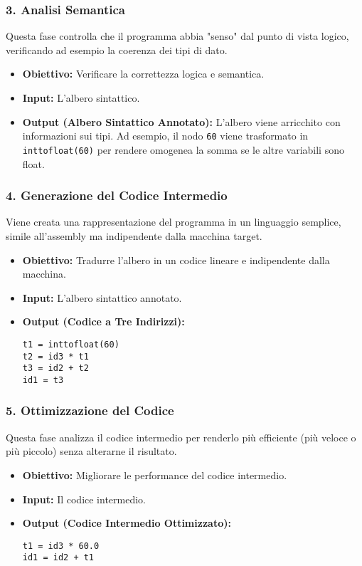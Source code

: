 \subsubsection{3. Analisi Semantica}
Questa fase controlla che il programma abbia "senso" dal punto di vista logico, verificando ad esempio la coerenza dei tipi di dato.
\begin{itemize}
    \item \textbf{Obiettivo:} Verificare la correttezza logica e semantica.
    \item \textbf{Input:} L'albero sintattico.
    \item \textbf{Output (Albero Sintattico Annotato):} L'albero viene arricchito con informazioni sui tipi. Ad esempio, il nodo \texttt{60} viene trasformato in \texttt{inttofloat(60)} per rendere omogenea la somma se le altre variabili sono float.
\end{itemize}

\subsubsection{4. Generazione del Codice Intermedio}
Viene creata una rappresentazione del programma in un linguaggio semplice, simile all'assembly ma indipendente dalla macchina target.
\begin{itemize}
    \item \textbf{Obiettivo:} Tradurre l'albero in un codice lineare e indipendente dalla macchina.
    \item \textbf{Input:} L'albero sintattico annotato.
    \item \textbf{Output (Codice a Tre Indirizzi):}
    \begin{Verbatim}[frame=single, label=Codice Intermedio]
t1 = inttofloat(60)
t2 = id3 * t1
t3 = id2 + t2
id1 = t3
    \end{Verbatim}
\end{itemize}

\subsubsection{5. Ottimizzazione del Codice}
Questa fase analizza il codice intermedio per renderlo più efficiente (più veloce o più piccolo) senza alterarne il risultato.
\begin{itemize}
    \item \textbf{Obiettivo:} Migliorare le performance del codice intermedio.
    \item \textbf{Input:} Il codice intermedio.
    \item \textbf{Output (Codice Intermedio Ottimizzato):}
    \begin{Verbatim}[frame=single, label=Codice Ottimizzato]
t1 = id3 * 60.0
id1 = id2 + t1
    \end{Verbatim}
\end{itemize}

